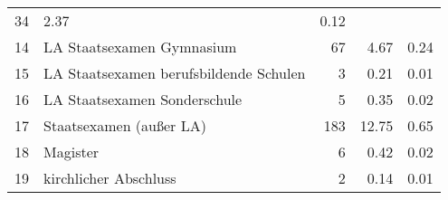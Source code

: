 \begin{longtable}{lXrrr}
       \num{34} &
       \num[round-mode=places,round-precision=2]{2,37} &
         \num[round-mode=places,round-precision=2]{0,12} \\

     14 &
     \multicolumn{1}{X}{ LA Staatsexamen Gymnasium   } &


       \num{67} &
       \num[round-mode=places,round-precision=2]{4,67} &
         \num[round-mode=places,round-precision=2]{0,24} \\

     15 &
     \multicolumn{1}{X}{ LA Staatsexamen berufsbildende Schulen   } &


       \num{3} &
       \num[round-mode=places,round-precision=2]{0,21} &
         \num[round-mode=places,round-precision=2]{0,01} \\

     16 &
     \multicolumn{1}{X}{ LA Staatsexamen Sonderschule   } &


       \num{5} &
       \num[round-mode=places,round-precision=2]{0,35} &
         \num[round-mode=places,round-precision=2]{0,02} \\

     17 &
     \multicolumn{1}{X}{ Staatsexamen (außer LA)   } &


       \num{183} &
       \num[round-mode=places,round-precision=2]{12,75} &
         \num[round-mode=places,round-precision=2]{0,65} \\

     18 &
     \multicolumn{1}{X}{ Magister   } &


       \num{6} &
       \num[round-mode=places,round-precision=2]{0,42} &
         \num[round-mode=places,round-precision=2]{0,02} \\

     19 &
     \multicolumn{1}{X}{ kirchlicher Abschluss   } &


       \num{2} &
       \num[round-mode=places,round-precision=2]{0,14} &
         \num[round-mode=places,round-precision=2]{0,01} \\


\end{longtable}
